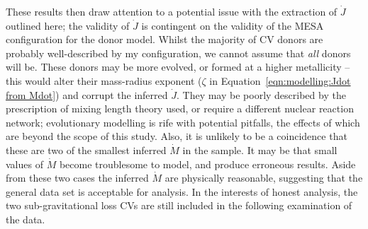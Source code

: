 These results then draw attention to a potential issue with the extraction of $\dot J$ outlined here; the validity of $\dot J$ is contingent on the validity of the MESA configuration for the donor model. Whilst the majority of CV donors are probably well-described by my configuration, we cannot assume that \textit{all} donors will be.
These donors may be more evolved, or formed at a higher metallicity -- this would alter their mass-radius exponent ($\zeta$ in Equation~\ref{eqn:modelling:Jdot from Mdot}) and corrupt the inferred $\dot J$. They may be poorly described by the prescription of mixing length theory used, or require a different nuclear reaction network; evolutionary modelling is rife with potential pitfalls, the effects of which are beyond the scope of this study.
Also, it is unlikely to be a coincidence that these are two of the smallest inferred $\dot M$ in the sample. It may be that small values of $\dot M$ become troublesome to model, and produce erroneous results.
Aside from these two cases the inferred $\dot M$ are physically reasonable, suggesting that the general data set is acceptable for analysis. In the interests of honest analysis, the two sub-gravitational loss CVs are still included in the following examination of the data.


